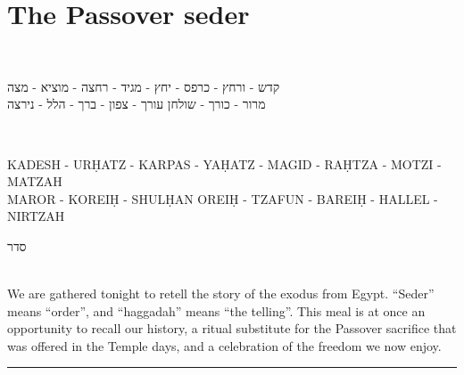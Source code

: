\documentclass[a4paper,10pt,openany]{memoir}
\newcommand{\hchapter}[1]{
  \begin{hebrew}
    \begin{Spacing}{.97}
      \newpage
      \strut

      \vspace{.15em}

      \begin{flushleft}
      \noindent\Huge #1
      \end{flushleft}

      \vspace{1em}
    \end{Spacing}
  \end{hebrew}
}
\newcommand{\HgFill}{\vfill \hrule \vfill}
\newenvironment{HgEnglish}{\strut\\\noindent}{\vspace{1em}}
\newenvironment{HgTranslit}{\strut\\\noindent\begin{itshape}}{\end{itshape}\vspace{1em}}
\newenvironment{HgHebrew}{\begin{hebrew}\strut\\\noindent\LARGE}{\end{hebrew}}
\begin{document}
\chapter*{The Passover seder}

\vfill

\vspace{-2em}
\begin{HgHebrew}
  \begin{center}
  קדש 
  -
  ורחץ
  -
  כרפס 
  -
  יחץ 
  -
  מגיד 
  -
  רחצה 
  -
  מוציא
  -
  מצה 
  \\
  מרור 
  -
  כורך 
  -
  שולחן עורך 
  -
  צפון
  -
  ברך 
  -
  הלל 
  -
  נירצה 
  \end{center}
\end{HgHebrew}
\begin{HgTranslit}
  \begin{center}
  {\footnotesize 
    KADESH - UR\d{H}ATZ - KARPAS - YA\d{H}ATZ - %
    MAGID - RA\d{H}TZA - MOTZI - MATZAH \\ 
    MAROR - KOREI\d{H} - SHUL\d{H}AN OREI\d{H} - %
    TZAFUN - BAREI\d{H} - HALLEL - NIRTZAH}
  \end{center}
\end{HgTranslit}

\vfill

\hchapter{סדר}

\vfill

\begin{HgEnglish}
  We are gathered tonight to retell the story of the exodus from Egypt.
  ``Seder'' means ``order'', and ``haggadah'' means ``the telling''. This meal
  is at once an opportunity to recall our history, a ritual substitute for the
  Passover sacrifice that was offered in the Temple days, and a celebration of
  the freedom we now enjoy.
\end{HgEnglish}

\HgFill
\end{document}
